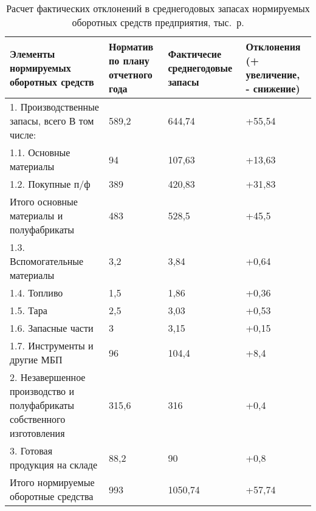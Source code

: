 \begin{table}[h!]
  \caption{Расчет фактических отклонений в среднегодовых запасах
  нормируемых оборотных средств предприятия, тыс.~р.}
  \label{tbl:result_reserve}
    \centering
    \small{
    \begin{tabular}{| p{} | p{} |
                      p{} | p{} |}
      \hline
      Элементы нормируемых оборотных средств
      & Норматив по плану \newline отчетного года
      & Фактичесие среднегодовые запасы
      & Отклонения \newline (+ увеличение, \newline - снижение) \\
      \hline

      1. Производственные \newline запасы, всего \newline
      В том числе:
      & 589{,}2
      & 644{,}74
      & +55{,}54 \\
      \hline

      1.1. Основные материалы
      & 94
      & 107{,}63
      & +13{,}63 \\
      \hline

      1.2. Покупные п/ф
      & 389
      & 420{,}83
      & +31{,}83 \\
      \hline

      Итого основные материалы и полуфабрикаты
      & 483
      & 528{,}5
      & +45{,}5 \\
      \hline

      1.3. Вспомогательные \newline материалы
      & 3{,}2
      & 3{,}84
      & +0{,}64 \\
      \hline

      1.4. Топливо
      & 1{,}5
      & 1{,}86
      & +0{,}36 \\
      \hline

      1.5. Тара
      & 2{,}5
      & 3{,}03
      & +0{,}53 \\
      \hline

      1.6. Запасные части
      & 3
      & 3{,}15
      & +0{,}15 \\
      \hline

      1.7. Инструменты и другие МБП
      & 96
      & 104{,}4
      & +8{,}4 \\
      \hline

      2. Незавершенное производство и полуфабрикаты собственного изготовления
      & 315{,}6
      & 316
      & +0{,}4 \\
      \hline

      3. Готовая продукция \newline на складе
      & 88{,}2
      & 90
      & +0{,}8 \\
      \hline

      Итого нормируемые \newline оборотные средства
      & 993
      & 1050{,}74
      & +57{,}74 \\
      \hline
    \end{tabular}
    }
\end{table}

